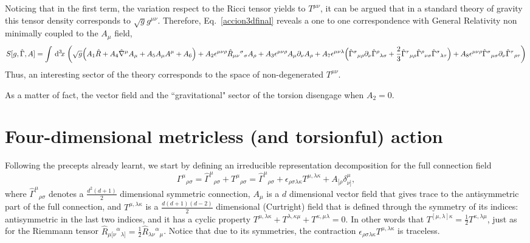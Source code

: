 \documentclass[twocolumn,aps,
  showpacs,showkeys,prd,superscriptaddress]{revtex4-1}
\newcommand{\hl}[1]{{\color{red} \textbf{#1}}}
\begin{document}
Noticing that in  the first term, the variation respect to the Ricci tensor yields to $T^{\mu\nu}$, it can be argued that in a standard theory of gravity this tensor density corresponds to $\sqrt{g}g^{\mu\nu}$.
Therefore, Eq.~\eqref{accion3dfinal} reveals a one to one correspondence with General Relativity non minimally coupled to the $A_\mu$ field, %
\begin{dmath}
  \label{accion3dGR}
  S[g,\hat{\Gamma},A] = \int \dn{3}{x} \bigg(
  \sqrt{g} \Big(  A_1 \hat{R} + A_4\hat{\nabla}^\mu A_\mu + A_5 A_\mu A^\mu + A_6  \Big)
  + A_2\epsilon^{\mu\nu\rho} \hat{R}_{\mu\nu}{}^{\sigma}{}_\sigma A_\rho
  + A_3\epsilon^{\mu\nu\rho}A_\mu\partial_\nu A_\rho
  + A_7\epsilon^{\mu\nu\lambda}\Big(\hat{\Gamma}^{\sigma}{}_{\mu\rho}\partial_\nu\hat{\Gamma}^{\rho}{}_{\lambda\sigma}
  + \frac{2}{3}\hat{\Gamma}^{\tau}{}_{\mu\rho}\hat{\Gamma}^{\rho}{}_{\nu\sigma}{}\hat{\Gamma}^{\sigma}{}_{\lambda\tau}{}\Big)
  + A_8\epsilon^{\mu\nu\rho}\hat{\Gamma}^{\sigma}{}_{\mu\sigma}\partial_\nu\hat{\Gamma}^{\tau}{}_{\rho\tau}
  \bigg)
\end{dmath}
Thus, an interesting sector of the theory corresponds to the space of non-degenerated $T^{\mu\nu}$. 

As a matter of fact, the vector field and the ``gravitational" sector of the torsion disengage when $A_2=0$.


\section{Four-dimensional metricless (and torsionful) action}

Following the precepts  already learnt, we start  by defining an irreducible representation decomposition for the full connection field 
\begin{equation}
  \Gamma^\mu{}_{\rho\sigma} = \hat{\Gamma}^\mu{}_{\rho\sigma} + T^\mu{}_{\rho\sigma} = \hat{\Gamma}^\mu{}_{\rho\sigma} + \epsilon_{\rho\sigma\lambda\kappa}T^{\mu,\lambda\kappa}+A_{[\rho}\delta^\mu_{\nu]},
\end{equation}
where $\hat{\Gamma}^\mu{}_{\rho\sigma}$ denotes a $\tfrac{d^2(d+1)}{2}$ dimensional symmetric connection, $A_\mu$ is a $d$ dimensional vector field  that gives trace to the antisymmetric part of the full connection, and  $T^{\mu,\lambda\kappa}$ is a $\tfrac{d(d+1)(d-2)}{2}$ dimensional (Curtright) field that is defined through the symmetry of its indices: antisymmetric in the last two indices, and it has a cyclic property $T^{\mu,\lambda\kappa}+T^{\lambda,\kappa\mu}+T^{\kappa,\mu\lambda}=0$. In other words that $T^{[\mu,\lambda]\kappa}=\frac{1}{2}T^{\kappa,\lambda\mu}$, just as for  the Riemmann tensor $\hat{R}_{\mu[\nu}{}^\alpha{}_{\lambda]}=\frac{1}{2}\hat{R}_{\lambda\nu}{}^\alpha{}_{\mu}$. Notice that due to its symmetries, the contraction $\epsilon_{\rho\sigma\lambda\kappa}T^{\mu,\lambda\kappa}$ is traceless.
\end{document}
